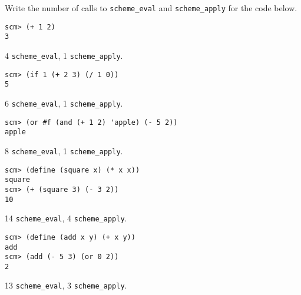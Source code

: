 \begin{blocksection}
\question Write the number of calls to \lstinline$scheme_eval$ and
\lstinline$scheme_apply$ for the code below.

 \begin{lstlisting}
scm> (+ 1 2)
3
\end{lstlisting}

\begin{solution}[1in]
4 \lstinline$scheme_eval$, 1 \lstinline$scheme_apply$.
\end{solution}

 \begin{lstlisting}
scm> (if 1 (+ 2 3) (/ 1 0))
5
\end{lstlisting}

\begin{solution}[1in]
6 \lstinline$scheme_eval$, 1 \lstinline$scheme_apply$.
\end{solution}

 \begin{lstlisting}
scm> (or #f (and (+ 1 2) 'apple) (- 5 2))
apple
\end{lstlisting}

\begin{solution}[1in]
8 \lstinline$scheme_eval$, 1 \lstinline$scheme_apply$.
\end{solution}

\begin{lstlisting}
scm> (define (square x) (* x x))
square
scm> (+ (square 3) (- 3 2))
10
\end{lstlisting}

\begin{solution}[1in]
14 \lstinline$scheme_eval$, 4 \lstinline$scheme_apply$.
\end{solution}

 \begin{lstlisting}
scm> (define (add x y) (+ x y))
add
scm> (add (- 5 3) (or 0 2))
2
\end{lstlisting}

\begin{solution}[1in]
13 \lstinline$scheme_eval$, 3 \lstinline$scheme_apply$.
\end{solution}
\end{blocksection}
